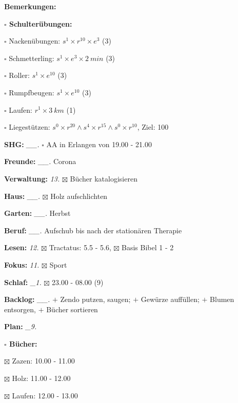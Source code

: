 \documentclass[10pt,a4paper]{article}
\newcommand\prop[1] {{\color {alizarin} {\bf #1}}}        %
\newcommand\mand[1] {{\color {burntorange} {\bf #1}}}     %
\newcommand\topspace{\vskip -15pt \hskip 20pt}
\newcommand\bottomspace{\vskip 4pt}
\newcommand\n[1] { {\sl #1.} \hskip 5pt }
\begin{document}
\begin{mdframed}[style=daystyle]
\begin{labeling}{{\mand {Bemerkungen:}}}
\begin{minipage}{0.75\textwidth}
\begin{labeling}{\prop {$\square$ {Schulterübungen:}}}
      \item[$\square$ Nackenübungen:]   $s^1 \times r^{10} \times e^3$ (3)
      \item[$\square$ Schmetterling:]   $s^1 \times e^3 \times 2\ min$ (3)
      \item[$\square$ Roller:]          $s^1 \times e^{10}$ (3)
      \item[$\square$ Rumpfbeugen:]     $s^1 \times e^{10}$ (3)
      \item[$\square$ Laufen:]          $r^1 \times 3\ km$ (1)
      \item[$\square$ Liegestützen:]    $s^0 \times r^{20} \land s^4 \times r^{15} \land s^0 \times r^{10}$, Ziel: 100
      \end{labeling}
    \end{minipage}
    \bottomspace        
  \item[{\mand {SHG:}}]          \n{\_\_} $\square$ AA in Erlangen von 19.00 - 21.00
  \item[{\mand {Freunde:}}]      \n{\_\_} Corona
  \item[{\mand {Verwaltung:}}]     \n{13} $\boxtimes$ Bücher katalogisieren
  \item[{\mand {Haus:}}]         \n{\_\_} $\boxtimes$ Holz aufschlichten
  \item[{\mand {Garten:}}]       \n{\_\_} Herbst
  \item[{\mand {Beruf:}}]        \n{\_\_} Aufschub bis nach der stationären Therapie
  \item[{\mand {Lesen:}}]          \n{12} $\boxtimes$ Tractatus: 5.5 - 5.6, $\boxtimes$ Basis Bibel 1 - 2
  \item[{\mand {Fokus:}}]          \n{11} $\boxtimes$ Sport
  \item[{\mand {Schlaf:}}]        \n{\_1} $\boxtimes$ 23.00 - 08.00 (9)
  \item[{\mand {Backlog:}}]      \n{\_\_} 
    $+$ Zendo putzen, saugen; $+$ Gewürze auffüllen; $+$ Blumen entsorgen, $+$ Bücher sortieren
  \item[{\mand {Plan:}}]          \n{\_9}
    \topspace
    \begin{minipage}{0.75\textwidth}  
      \begin{labeling}{\prop {$\square$ { Bücher:}}} 
        \setlength\itemsep{-3pt}
      \item[$\boxtimes$ Zazen:]   10.00 - 11.00
      \item[$\boxtimes$ Holz:]    11.00 - 12.00        
      \item[$\boxtimes$ Laufen:]  12.00 - 13.00        

\end{labeling}
\end{minipage}
\end{labeling}
\end{mdframed}
\end{document}
